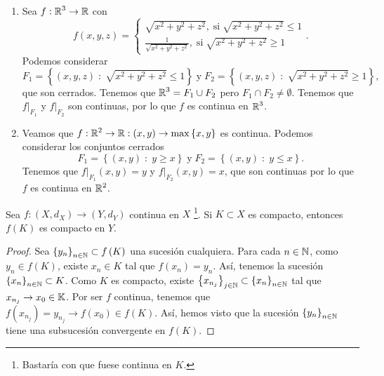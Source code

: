 \begin{eg}
\begin{enumerate}
\item Sea $\displaystyle f : \mathbb{R}^{3} \to \mathbb{R} $ con 
	\[ f\left(x,y,z\right) = 
	\begin{cases}
	\sqrt{x^{2}+y^{2}+z^{2}}, \; \text{si} \; \sqrt{x^{2}+y^{2}+z^{2}}\leq 1 \\
	\frac{1}{\sqrt{x^{2}+y^{2}+z^{2}}}, \; \text{si} \; \sqrt{x^{2}+y^{2}+z^{2}} \geq 1
	\end{cases}
	.\]
	Podemos considerar 
	\[ \displaystyle F_{1} = \left\{ \left(x,y,z\right) \; : \; \sqrt{x^{2}+y^{2}+z^{2}}\leq 1\right\} \; \text{y} \; F_{2} = \left\{ \left(x,y,z\right) \; : \; \sqrt{x^{2}+y^{2}+z^{2}} \geq 1\right\},\]
	que son cerrados. Tenemos que $\displaystyle \mathbb{R}^{3} = F_{1} \cup F_{2} $ pero $\displaystyle F_{1} \cap F_{2} \neq \emptyset $. Tenemos que $\displaystyle f|_{F_{1}} $ y $\displaystyle f|_{F_{2}} $ son continuas, por lo que $\displaystyle f $ es continua en $\displaystyle \mathbb{R}^{3} $.
\item Veamos que $\displaystyle f : \mathbb{R}^{2} \to \mathbb{R} : \left(x,y\right) \to \max \left\{ x,y\right\}  $ es continua. Podemos considerar los conjuntos cerrados
	\[F_{1} = \left\{ \left(x,y\right) \; : \; y \geq x\right\} \; \text{y} \; F_{2} = \left\{ \left(x,y\right) \; : \; y \leq x\right\}  .\]
	Tenemos que $\displaystyle f|_{F_{1}}\left(x,y\right) = y $ y $\displaystyle f|_{F_{2}} \left(x,y\right) = x $, que son continuas por lo que $\displaystyle f $ es continua en $\displaystyle \mathbb{R}^{2} $.
\end{enumerate}
\end{eg}
\begin{theorem}
Sea $\displaystyle f : \left(X, d _{X}\right) \to \left(Y, d _{Y}\right) $ continua en $\displaystyle X $ \footnote{Bastaría con que fuese continua en $\displaystyle K $.}. Si $\displaystyle K \subset X $ es compacto, entonces $\displaystyle f\left(K\right) $ es compacto en $\displaystyle Y $.
\end{theorem}
\begin{proof}
	Sea $\displaystyle \left\{ y_{n}\right\} _{n\in\mathbb{N}}\subset f\left(K\right) $ una sucesión cualquiera. Para cada $\displaystyle n \in \mathbb{N} $, como $\displaystyle y_{n} \in f\left(K\right) $, existe $\displaystyle x_{n} \in K $ tal que $\displaystyle f\left(x_{n}\right) = y_{n} $. Así, tenemos la sucesión $\displaystyle \left\{ x_{n}\right\} _{n\in\mathbb{N}} \subset K $. Como $\displaystyle K $ es compacto, existe $\displaystyle \left\{ x_{n_{j}}\right\} _{j \in \mathbb{N}} \subset \left\{ x_{n}\right\} _{n\in\mathbb{N}} $ tal que $\displaystyle x_{n_{j}} \to x_{0} \in \mathbb{K} $. Por ser $\displaystyle f $ continua, tenemos que $\displaystyle f\left(x_{n_{j}}\right) = y_{n_{j}} \to f\left(x_{0}\right) \in f\left(K\right) $.
	Así, hemos visto que la sucesión $\displaystyle \left\{ y_{n}\right\} _{n\in\mathbb{N}} $ tiene una subsucesión convergente en $\displaystyle f\left(K\right) $.
\end{proof}
